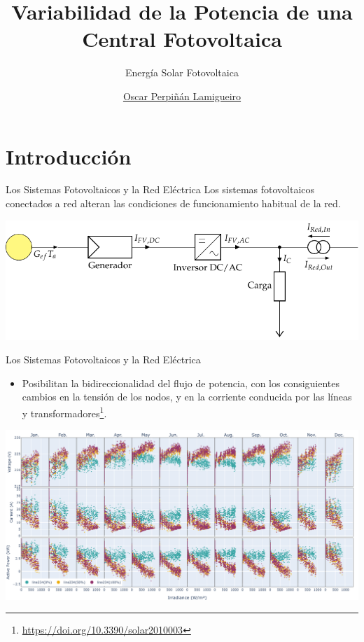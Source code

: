 \documentclass[aspectratio=169, usenames,svgnames,dvipsnames]{beamer}
\author{\href{https://oscarperpinan.github.io}{Oscar Perpiñán Lamigueiro}}
\date{}
\title{Variabilidad de la Potencia de una Central Fotovoltaica}
\subtitle{Energía Solar Fotovoltaica}
\institute[UPM]{Universidad Politécnica de Madrid}
\begin{document}
\maketitle

\section{Introducción}
\label{sec:orgb5bc3f1}

\begin{frame}[label={sec:org3460630}]{Los Sistemas Fotovoltaicos y la Red Eléctrica}
Los sistemas fotovoltaicos conectados a red alteran las condiciones de
funcionamiento habitual de la red.

\begin{center}
\includegraphics[width=\textwidth]{../figs/SFCR_bidireccional.pdf}
\end{center}
\end{frame}

\begin{frame}[label={sec:org9fa6db6}]{Los Sistemas Fotovoltaicos y la Red Eléctrica}
\begin{itemize}
\item Posibilitan la bidireccionalidad del flujo de potencia, con los
consiguientes cambios en la tensión de los nodos, y en la corriente
conducida por las líneas y transformadores\footnote{\url{https://doi.org/10.3390/solar2010003}}.
\end{itemize}

\begin{center}
\includegraphics[height=0.65\textheight]{../figs/S_VIP_Irr_line234.pdf}
\end{center}
\end{frame}
\end{document}
